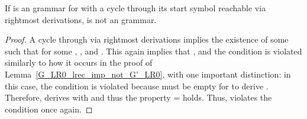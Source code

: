 \begin{isabellebody}
\begin{isamarkuptext}
\begin{lemma}\label{G_LR_Suc_cycle_imp_not_G'_LR_Suc}
If  is an  grammar for  with a cycle through its start symbol  reachable
via rightmost derivations,  is not an
 grammar.
\begin{proof}
A cycle through  via rightmost derivations implies the existence of some  such that
 for some , , and 
. This again implies that , and the  condition is violated similarly 
to how it occurs in the proof of Lemma~\ref{G_LR0_lrec_imp_not_G'_LR0}, with one important 
distinction: in this case, the condition is violated because  must be empty for 
 to derive . Therefore,  derives 
 with  and thus the property 
 = \isa{{\isacharbrackleft}{\kern0pt}{\isacharbrackright}{\kern0pt}} holds. Thus,  violates the  condition once again.
\end{proof}
\end{lemma}


\end{isamarkuptext}
\end{isabellebody}
